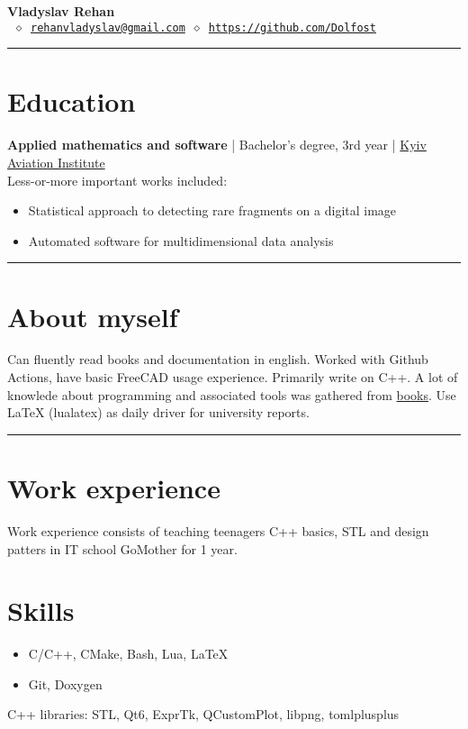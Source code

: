 


\newcommand{\crule}{\par\noindent\rule{\textwidth}{0.5pt}}


\thispagestyle{empty}

\begin{center}
	\LARGE \textbf{Vladyslav Rehan}\\[4mm] \normalsize
	\texttt{ \(\diamond\)\
	\href{mailto:rehanvladyslav@gmail.com}{rehanvladyslav@gmail.com} \(\diamond\)
	\url{https://github.com/Dolfost}}
\end{center}
\crule
\section{Education}
\textbf{Applied mathematics and software} | Bachelor's degree, 3rd year | \href{http://nau.edu.ua/en/}{Kyiv Aviation Institute}\\
Less-or-more important works included:
\begin{itemize}
	\item Statistical approach to detecting rare fragments on a digital image
	\item Automated software for multidimensional data analysis
\end{itemize}

\crule
\section{About myself}
Can fluently read books and documentation in english. Worked with Github
Actions, have basic FreeCAD usage experience. Primarily write on C++. A lot of
knowlede about programming and associated tools was gathered from
\href{https://github.com/Dolfost/Dolfost/blob/main/README.md#literature--sources}{books}.
Use LaTeX (lualatex) as daily driver for university reports.

\crule
\section{Work experience}
Work experience consists of teaching teenagers C++ basics, STL and design
patters in IT school GoMother for 1 year.

\section{Skills}
\begin{itemize}
	\item C/C++, CMake, Bash, Lua, LaTeX
	\item Git, Doxygen
\end{itemize}
C++ libraries: STL, Qt6, ExprTk, QCustomPlot, libpng, tomlplusplus

